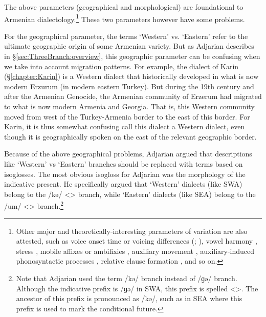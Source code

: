 The above parameters (geographical and morphological) are foundational to Armenian dialectology.\footnote{Other       major and theoretically-interesting parameters of variation are also attested, such as voice onset time or voicing differences (\citealt[\S1.1.1]{Vaux-1998-ArmenianPhono}; \citealt{Baronian-2017-TwoProblemsArmenianPhono}), vowel harmony \citep{Vaux-1998-ArmenianPhono}, stress \citep{DeLisi-2018-ArmenianProsodyDiachrony}, mobile affixes or ambifixies \citep{BezrukovDolatian-2020-PLCArmenianMobile,Bezrukov-2022-DissCaucasusMotionArmenian}, auxiliary movement \citep{Comrie-1984-SomeFormalPropertiesFOcusEasternArmenian,KahnemuyipourMegerdoomian-2011-secondcliticvP,KahnemuyipourMegerdoomian-2017-positionalDistriutionFocus}, auxiliary-induced phonosyntactic processes \citep{DolatianEtAl-prep-IranianGrammar}, relative clause formation \citep{Hodgson-2019-DissRelativeClauseArmenianSyntax}, and so on.} These two parameters however  have some problems. 

For the geographical parameter, the terms `Western' vs. `Eastern' refer to the ultimate geographic origin of some Armenian variety. But as Adjarian describes in \S\ref{sec:ThreeBranch:overview}, this geographic parameter can be confusing when we take into account migration patterns. For example, the dialect of Karin (\S\ref{chapter:Karin}) is a Western dialect that historically developed in what is now modern Erzurum (in modern eastern Turkey). But during the 19th century and after the Armenian Genocide, the Armenian community of Erzerum had migrated to what is now modern Armenia and Georgia. That is, this Western community moved from west of the Turkey-Armenia border to the east of this border. For Karin, it is thus somewhat confusing call this dialect a Western dialect, even though it is geographically spoken on the east of the relevant geographic border. 

Because of the above geographical problems, Adjarian argued that descriptions like `Western' vs `Eastern' branches should be replaced with terms based on isoglosses. The most obvious isogloss for Adjarian was the morphology of the indicative present. He specifically argued that `Western' dialects (like SWA) belong to the /kə/ <> branch, while `Eastern' dialects (like SEA) belong to the /um/ <> branch.\footnote{Note that Adjarian used the term /kə/ branch instead of /ɡə/ branch. Although the indicative prefix is /ɡə/ in SWA, this prefix is spelled <>. The ancestor of this prefix is pronounced as /kə/, such as in SEA where this prefix is used to mark the conditional future.}

